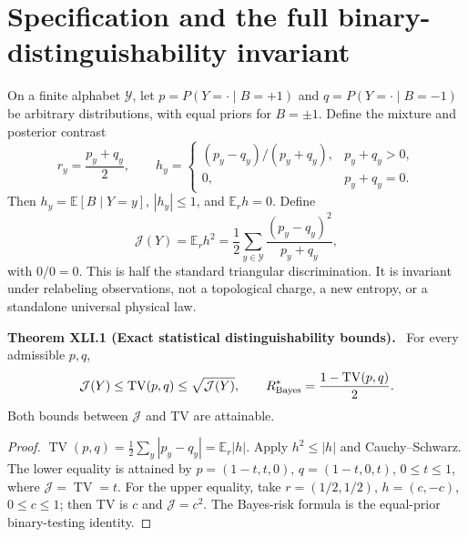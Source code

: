 \documentclass[11pt,a4paper,oneside]{book}
\newcommand{\statement}[3]{\par\medskip\noindent\textbf{#1 #2 (#3).}\ }
\begin{document}
\section{Specification and the full binary-distinguishability invariant}
On a finite alphabet $\mathcal Y$, let $p=P(Y=\cdot\mid B=+1)$ and $q=P(Y=\cdot\mid B=-1)$ be arbitrary distributions, with equal priors for $B=\pm1$. Define the mixture and posterior contrast
\begin{equation}r_y=\frac{p_y+q_y}2,\qquad h_y=\begin{cases}(p_y-q_y)/(p_y+q_y),&p_y+q_y>0,\\0,&p_y+q_y=0.\end{cases}\tag{167}\end{equation}
Then $h_y=\mathbb E[B\mid Y=y]$, $|h_y|\le1$, and $\mathbb E_rh=0$. Define
\begin{equation}\mathcal J(Y)=\mathbb E_rh^2=\frac12\sum_{y\in\mathcal Y}\frac{(p_y-q_y)^2}{p_y+q_y},\tag{168}\end{equation}
with $0/0=0$. This is half the standard triangular discrimination. It is invariant under relabeling observations, not a topological charge, a new entropy, or a standalone universal physical law.
\statement{Theorem}{XLI.1}{Exact statistical distinguishability bounds}
For every admissible $p,q$,
\[\mathcal J(Y)\le\operatorname{TV}(p,q)\le\sqrt{\mathcal J(Y)},\qquad R^*_{\rm Bayes}=\frac{1-\operatorname{TV}(p,q)}2.\]
Both bounds between $\mathcal J$ and TV are attainable.
\begin{proof}
$\operatorname{TV}(p,q)=\tfrac12\sum_y|p_y-q_y|=\mathbb E_r|h|$. Apply $h^2\le|h|$ and Cauchy--Schwarz. The lower equality is attained by $p=(1-t,t,0)$, $q=(1-t,0,t)$, $0\le t\le1$, where $\mathcal J=\operatorname{TV}=t$. For the upper equality, take $r=(1/2,1/2)$, $h=(c,-c)$, $0\le c\le1$; then TV is $c$ and $\mathcal J=c^2$. The Bayes-risk formula is the equal-prior binary-testing identity.
\end{proof}
\end{document}
